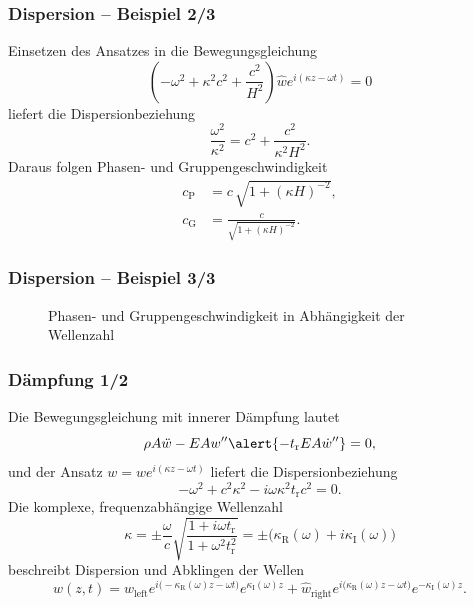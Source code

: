 \documentclass[hyperref={pdfpagemode=FullScreen, colorlinks=false}]{beamer}
\begin{document}
\begin{frame}
\frametitle{Dispersion -- Beispiel 2/3} 
Einsetzen des Ansatzes in die Bewegungsgleichung
\begin{equation*}
 \left(-\omega^2+\kappa^2 c^2+\frac{c^2}{H^2} \right)\hat{w}e^{i(\kappa z-\omega t)}=0 
\end{equation*}
 liefert die Dispersionbeziehung
\begin{equation*}
 \frac{\omega^2}{\kappa^2}=c^2+\frac{c^2}{\kappa^2 H^2}.
\end{equation*}
Daraus folgen Phasen- und Gruppengeschwindigkeit
\begin{align*}
 c_\mathrm{P}&=c\,\sqrt{1+(\kappa H)^{-2}}, \\
 c_\mathrm{G}&=\frac{c}{\sqrt{1+(\kappa H)^{-2}}}.
\end{align*}
\end{frame}

\begin{frame}
\frametitle{Dispersion -- Beispiel 3/3} 
\begin{figure}

\caption*{Phasen- und Gruppengeschwindigkeit in Abhängigkeit der Wellenzahl}
\end{figure}
\end{frame}

\begin{frame}
\frametitle{Dämpfung 1/2}
Die Bewegungsgleichung mit \alert{innerer Dämpfung} lautet
\begin{equation*}
\rho A \ddot{w} - EA w'' \alert{-t_\mathrm{r} EA \dot{w}''}=0,
\end{equation*}
und der Ansatz $w=\hat{w}e^{i(\kappa z-\omega t)}$ liefert die Dispersionbeziehung
\begin{equation*}
 -\omega^2+c^2\kappa^2-i\omega\kappa^2t_\mathrm{r}c^2=0.
\end{equation*}
Die komplexe, frequenzabhängige Wellenzahl
\begin{equation*}
\kappa=\pm \frac{\omega}{c}\sqrt{\frac{1+i\omega t_\mathrm{r}}{1+\omega^2t_\mathrm{r}^2}}=\pm\bigl(\kappa_\mathrm{R}(\omega)+i\kappa_\mathrm{I}(\omega)\bigr)
\end{equation*}
beschreibt Dispersion und Abklingen der Wellen
\begin{equation*}
 w(z,t)=\hat{w}_\mathrm{left}e^{i\bigl(-\kappa_\mathrm{R}(\omega) z-\omega t\bigr)}e^{\kappa_\mathrm{I}(\omega) z}
 +\hat{w}_\mathrm{right}e^{i\bigl(\kappa_\mathrm{R}(\omega) z-\omega t\bigr)}e^{-\kappa_\mathrm{I}(\omega) z} .
\end{equation*}
\end{frame}
\end{document}
